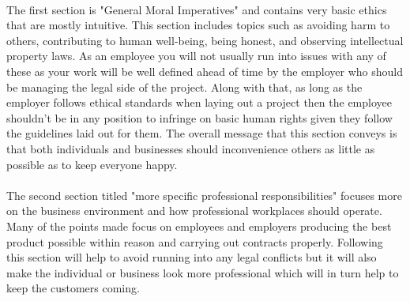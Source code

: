 \documentclass[notitlepage,a4paper,12pt]{article}
\begin{document}
\paragraph{}The first section is "General Moral Imperatives" and contains very basic ethics that are mostly intuitive. This section includes topics such as avoiding harm to others, contributing to human well-being, being honest, and observing intellectual property laws. As an employee you will not usually run into issues with any of these as your work will be well defined ahead of time by the employer who should be managing the legal side of the project. Along with that, as long as the employer follows ethical standards when laying out a project then the employee shouldn't be in any position to infringe on basic human rights given they follow the guidelines laid out for them. The overall message that this section conveys is that both individuals and businesses should inconvenience others as little as possible as to keep everyone happy.
\paragraph{}The second section titled "more specific professional responsibilities" focuses more on the business environment and how professional workplaces should operate. Many of the points made focus on employees and employers producing the best product possible within reason and carrying out contracts properly. Following this section will help to avoid running into any legal conflicts but it will also make the individual or business look more professional which will in turn help to keep the customers coming.
\end{document}
